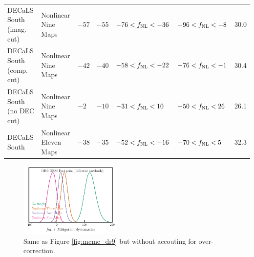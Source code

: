 \begin{table}
{\begin{tabular}{llllllr}
DECaLS South (imag. cut) & Nonlinear Nine Maps& $   -57$& $   -55$& $   -76<f_{\rm NL}<   -36$& $   -96<f_{\rm NL}<    -8$ &   30.0\\
DECaLS South (comp. cut) & Nonlinear Nine Maps& $   -42$& $   -40$& $   -58<f_{\rm NL}<   -22$& $   -76<f_{\rm NL}<    -1$ &   30.4\\
DECaLS South (no DEC cut) & Nonlinear Nine Maps& $    -2$& $   -10$& $   -31<f_{\rm NL}<    10$& $   -50<f_{\rm NL}<    26$ &   26.1\\
DECaLS South & Nonlinear Eleven Maps        & $   -38$& $   -35$& $   -52<f_{\rm NL}<   -16$& $   -70<f_{\rm NL}<     5$ &   32.3\\    
   \hline
    \end{tabular}}
\end{table}



\begin{figure}
    \centering
    \includegraphics[width=0.45\textwidth]{figures/mcmc_dr9methods1dnoshift.pdf}
    \caption{Same as Figure \ref{fig:mcmc_dr9} but without accouting for over-correction. }
    \label{fig:mcmcdr9noshift}
\end{figure}


